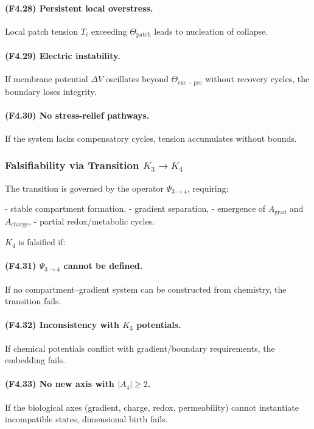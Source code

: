 \paragraph{(F4.28) Persistent local overstress.}
Local patch tension $T_i$ exceeding $\Theta_{\mathrm{patch}}$
leads to nucleation of collapse.

\paragraph{(F4.29) Electric instability.}
If membrane potential $\Delta V$ oscillates beyond
$\Theta_{\mathrm{exc-pre}}$ without recovery cycles, the boundary loses
integrity.

\paragraph{(F4.30) No stress-relief pathways.}
If the system lacks compensatory cycles, tension accumulates without
bounds.



\subsubsection{Falsifiability via Transition \texorpdfstring{$K_3 \to K_4$}{K_3 \to K_4}}

The transition is governed by the operator $\Psi_{3\to 4}$, requiring:

- stable compartment formation,
- gradient separation,
- emergence of $A_{\mathrm{grad}}$ and $A_{\mathrm{charge}}$,
- partial redox/metabolic cycles.

$K_4$ is falsified if:

\paragraph{(F4.31) $\Psi_{3\to 4}$ cannot be defined.}
If no compartment–gradient system can be constructed from chemistry,
the transition fails.

\paragraph{(F4.32) Inconsistency with \texorpdfstring{$K_3$}{K_3} potentials.}
If chemical potentials conflict with gradient/boundary requirements, the
embedding fails.

\paragraph{(F4.33) No new axis with \texorpdfstring{$|A_4| \ge 2$}{|A_4| }.}
If the biological axes (gradient, charge, redox, permeability) cannot
instantiate incompatible states, dimensional birth fails.

